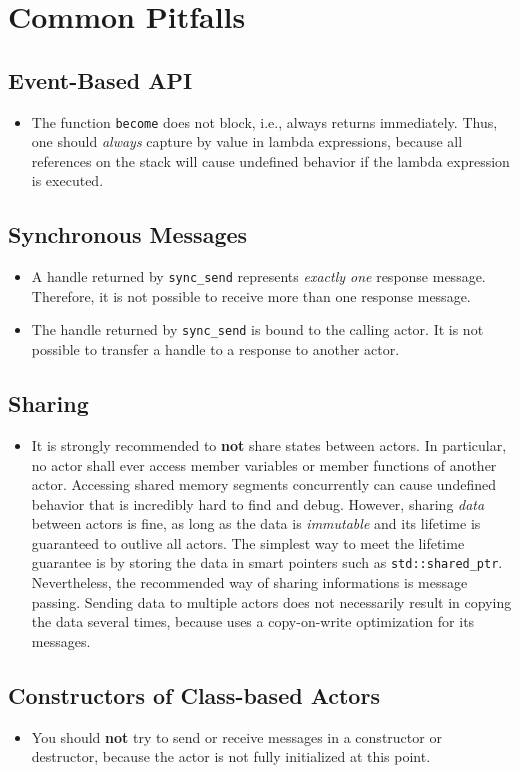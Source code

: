 \section{Common Pitfalls}
\label{Sec::Pitfalls}

\subsection{Event-Based API}

\begin{itemize}
\item The function \lstinline^become^ does not block, i.e., always returns immediately.
Thus, one should \textit{always} capture by value in lambda expressions, because all references on the stack will cause undefined behavior if the lambda expression is executed.
\end{itemize}

\subsection{Synchronous Messages}

\begin{itemize}

\item
A handle returned by \lstinline^sync_send^ represents \emph{exactly one} response message.
Therefore, it is not possible to receive more than one response message.

\item
The handle returned by \lstinline^sync_send^ is bound to the calling actor.
It is not possible to transfer a handle to a response to another actor.

\end{itemize}

\subsection{Sharing}

\begin{itemize}
\item It is strongly recommended to \textbf{not} share states between actors.
In particular, no actor shall ever access member variables or member functions of another actor.
Accessing shared memory segments concurrently can cause undefined behavior that is incredibly hard to find and debug.
However, sharing \textit{data} between actors is fine, as long as the data is \textit{immutable} and its lifetime is guaranteed to outlive all actors.
The simplest way to meet the lifetime guarantee is by storing the data in smart pointers such as \lstinline^std::shared_ptr^.
Nevertheless, the recommended way of sharing informations is message passing.
Sending data to multiple actors does not necessarily result in copying the data several times, because \ba uses a copy-on-write optimization for its messages.
\end{itemize}

\subsection{Constructors of Class-based Actors}

\begin{itemize}
\item You should \textbf{not} try to send or receive messages in a constructor or destructor, because the actor is not fully initialized at this point.
\end{itemize}
